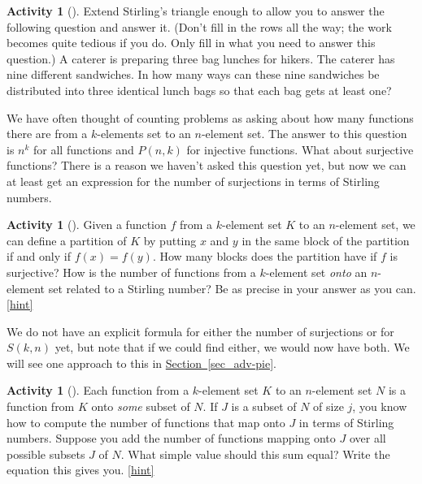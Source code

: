 \documentclass[10pt,]{book}
\theoremstyle{plain}
\theoremstyle{definition}
\theoremstyle{definition}
\theoremstyle{definition}
\newtheorem{activity}[project]{Activity}
\numberwithin{equation}{chapter}
\begin{document}
\begin{activity}[]\label{sandwiches}
\hypertarget{p-1094}{}%
Extend Stirling's triangle enough to allow you to answer the following question and answer it. (Don't fill in the rows all the way; the work becomes quite tedious if you do. Only fill in what you need to answer this question.) A caterer is preparing three bag lunches for hikers. The caterer has nine different sandwiches. In how many ways can these nine sandwiches be distributed into three identical lunch bags so that each bag gets at least one?%
\end{activity}
\hypertarget{p-1096}{}%
We have often thought of counting problems as asking about how many functions there are from a \(k\)-elements set to an \(n\)-element set.  The answer to this question is \(n^k\) for all functions and \(P(n,k)\) for injective functions.  What about surjective functions?  There is a reason we haven't asked this question yet, but now we can at least get an expression for the number of surjections in terms of Stirling numbers.%
\begin{activity}[]\label{activity-196}
\hypertarget{p-1097}{}%
Given a function \(f\) from a \(k\)-element set \(K\) to an \(n\)-element set, we can define a partition of \(K\) by putting \(x\) and \(y\) in the same block of the partition if and only if \(f(x)=f(y)\). How many blocks does the partition have if \(f\) is surjective? How is the number of functions from a \(k\)-element set \emph{onto} an \(n\)-element set related to a Stirling number? Be as precise in your answer as you can.%
\hfill{\tiny\hyperlink{a-203}{[hint]}\hypertarget{q-203}{}}\end{activity}
\hypertarget{p-1100}{}%
We do not have an explicit formula for either the number of surjections or for \(S(k,n)\) yet, but note that if we could find either, we would now have both.  We will see one approach to this in \hyperref[sec_adv-pie]{Section~\ref{sec_adv-pie}}.%
\begin{activity}[]\label{Stirlingfalling}
\hypertarget{p-1101}{}%
Each function from a \(k\)-element set \(K\) to an \(n\)-element set \(N\) is a function from \(K\) onto \emph{some} subset of \(N\). If \(J\) is a subset of \(N\) of size \(j\), you know how to compute the number of functions that map onto \(J\) in terms of Stirling numbers. Suppose you add the number of functions mapping onto \(J\) over all possible subsets \(J\) of \(N\). What simple value should this sum equal? Write the equation this gives you.%
\hfill{\tiny\hyperlink{a-204}{[hint]}\hypertarget{q-204}{}}\end{activity}
\end{document}
